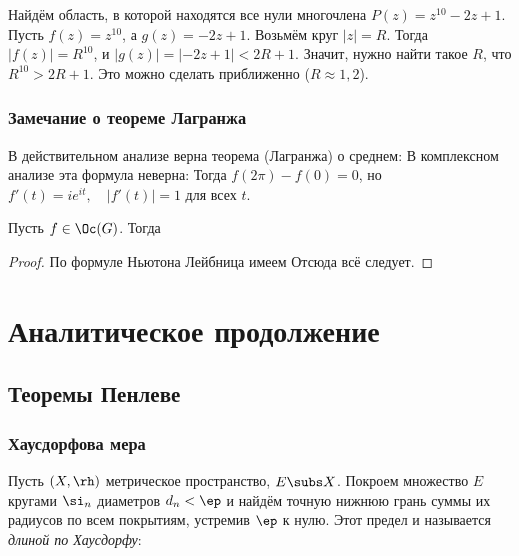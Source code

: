 \documentclass[a4paper]{article}
\def\dze{\,d\ze}
\begin{document}
\begin{ex}
Найдём область, в которой находятся все нули многочлена $P(z)=z^{10}-2z+1$. Пусть $f(z)=z^{10}$,
а $g(z)=-2z+1$. Возьмём круг $|z|=R$. Тогда $|f(z)|=R^{10}$, и $|g(z)|=|-2z+1|<2R+1$. Значит,
нужно найти такое $R$, что $R^{10}>2R+1$. Это можно сделать приближенно ($R\approx 1,2$).
\end{ex}

\subsubsection{Замечание о теореме Лагранжа}

В действительном анализе верна теорема (Лагранжа) о среднем:
В комплексном анализе эта формула неверна:
Тогда $f(2\pi)-f(0)=0$, но $f'(t)=ie^{it},  \quad |f'(t)|=1$ для всех $t$.

\begin{stm}
Пусть $f \in \Oc(G)$. Тогда
\end{stm}
\begin{proof}
По формуле Ньютона Лейбница имеем
\eqn{f(b)-f(a)=\intl{a}{b} f'(\ze)\dze.}
Отсюда всё следует.
\end{proof}


\section{Аналитическое продолжение}

\subsection{Теоремы Пенлеве}

\subsubsection{Хаусдорфова мера}

\begin{df}
Пусть $(X,\rh)$ метрическое пространство, $E \subs X$. Покроем множество $E$ кругами $\si_n$
диаметров $d_n < \ep$ и найдём точную нижнюю грань суммы их радиусов по всем покрытиям, устремив $\ep$ к нулю.
Этот предел и называется \emph{длиной по Хаусдорфу}:
\end{df}
\end{document}
